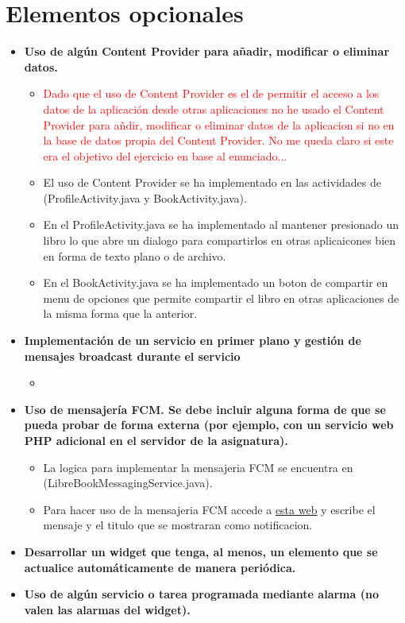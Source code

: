 \documentclass[a4paper,12pt]{report}
\begin{document}
    \section{Elementos opcionales}
      \begin{itemize}
        \item \textbf{Uso de algún Content Provider para añadir, modificar o eliminar datos.}
        \begin{itemize}
          \item \textcolor{red}{Dado que el uso de Content Provider es el de permitir el acceso a los datos de la aplicación desde otras aplicaciones no he usado el Content Provider para añdir, modificar o eliminar datos de la aplicacion si no en la base de datos propia del Content Provider. No me queda claro si este era el objetivo del ejercicio en base al enunciado...}
          \item El uso de Content Provider se ha implementado en las actividades de (ProfileActivity.java y BookActivity.java).
          \item En el ProfileActivity.java se ha implementado al mantener presionado un libro lo que abre un dialogo para compartirlos en otras aplicaicones bien en forma de texto plano o de archivo.
          \item En el BookActivity.java se ha implementado un boton de compartir en menu de opciones que permite compartir el libro en otras aplicaciones de la misma forma que la anterior.
        \end{itemize}
        \item \textbf{Implementación de un servicio en primer plano y gestión de mensajes broadcast durante el servicio}
        \begin{itemize}
          \item 
        \end{itemize}
        \item \textbf{Uso de mensajería FCM. Se debe incluir alguna forma de que se pueda probar de forma externa (por ejemplo, con un servicio web PHP adicional en el servidor de la asignatura).}
        \begin{itemize}
          \item La logica para implementar la mensajeria FCM se encuentra en (LibreBookMessagingService.java).
          \item Para hacer uso de la mensajeria FCM accede a \textcolor{blue}{\href{http://ec2-51-44-167-78.eu-west-3.compute.amazonaws.com/xgabina001/WEB/admin_panel.php}{esta web}} y escribe el mensaje y el titulo que se mostraran como notificacion.
        \end{itemize}
        \item \textbf{Desarrollar un widget que tenga, al menos, un elemento que se actualice automáticamente de manera periódica.}
        \item \textbf{Uso de algún servicio o tarea programada mediante alarma (no valen las alarmas del widget).}
      \end{itemize}
\end{document}
